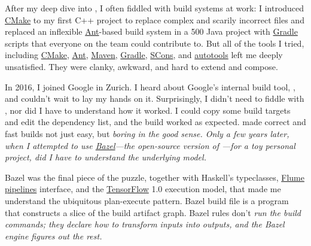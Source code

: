 \documentclass{article}
\begin{document}
After my deep dive into , I often fiddled with build systems at work:
I introduced \href{https://cmake.org/}{CMake} to my first C++ project to replace complex and scarily incorrect  files and
replaced an inflexible \href{https://ant.apache.org/}{Ant}-based build system in a 500  Java project with \href{https://gradle.org/}{Gradle} scripts that everyone on the team could contribute to.
But all of the tools I tried, including \href{https://cmake.org/}{CMake}, \href{https://ant.apache.org/}{Ant}, \href{https://maven.apache.org/}{Maven}, \href{https://gradle.org/}{Gradle}, \href{https://www.scons.org/}{SCons}, and \href{https://www.gnu.org/software/automake/manual/html_node/Autotools-Introduction.html}{autotools} left me deeply unsatisfied.
They were clanky, awkward, and hard to extend and compose.

In 2016, I joined Google in Zurich.
I heard about Google's internal build tool, , and couldn't wait to lay my hands on it.
Surprisingly, I didn't need to fiddle with , nor did I have to understand how it worked.
I could copy some build targets and edit the dependency list, and the build worked as expected.
 made correct and fast builds not just easy, but \em{boring} in the good sense.
Only a few years later, when I attempted to use \href{https://bazel.build/}{Bazel}---the open-source version of ---for a toy personal project, did I have to understand the underlying model.

Bazel was the final piece of the puzzle, together with Haskell's typeclasses, \href{https://research.google/pubs/flumejava-easy-efficient-data-parallel-pipelines/}{Flume pipelines} interface,  and the \href{https://www.tensorflow.org/}{TensorFlow} 1.0 execution model, that made me understand the ubiquitous plan-execute pattern.
Bazel build file is a program that constructs a slice of the build artifact graph.
Bazel rules don't \em{run} the build commands; they \em{declare} how to transform inputs into outputs, and the Bazel engine figures out the rest.
\end{document}
